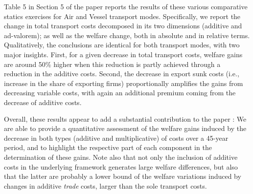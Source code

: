 \documentclass[a4paper,11pt]{article}
\begin{document}
Table 5 in Section 5 of the paper reports the results of these various comparative statics exercises for Air and Vessel transport modes. Specifically, we report the change in total transport costs decomposed in its two dimensions (additive and ad-valorem); as well as the welfare change, both in absolute and in relative terms. Qualitatively, the conclusions are identical for both transport modes, with two major insights. First, for a given decrease in total transport costs,  welfare gains are around 50\% higher when this reduction is partly achieved through a reduction in the additive costs. Second, the decrease in export sunk costs (i.e., increase in the share of exporting firms) proportionally amplifies the gains from decreasing variable costs, with again an additional premium coming from the decrease of additive costs.

Overall, these results appear to add a substantial contribution to the paper : We are able to provide a quantitative assessment of the welfare gains induced by the decrease in both types (additive and multiplicative) of costs over a 45-year period, and to highlight the respective part of each component in the determination of these gains. Note also that not only the inclusion of additive costs in the underlying framework generates large welfare differences, but also that the latter are probably a lower bound of the welfare variations induced by changes in additive \emph{trade} costs, larger than the sole transport costs.







\end{document}
